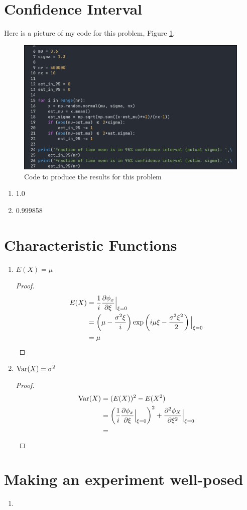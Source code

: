 \documentclass{article}
\begin{document}
\section{Confidence Interval}
    Here is a picture of my code for this problem, Figure \ref{fig:prob6_code}.
    \begin{figure}[t]
        \centering
        \includegraphics[width=\textwidth]{prob6_code.png}
        \caption{Code to produce the results for this problem}
        \label{fig:prob6_code}
    \end{figure}
    \begin{enumerate}[label=\roman*)]
        \item 1.0
        \item 0.999858
    \end{enumerate}

\section{Characteristic Functions}
    \begin{enumerate}[label=\roman*)]
        \item $E(X) = \mu$
            \begin{proof}
                \begin{align*}
                    E(X) &= \frac{1}{i}\frac{\partial \phi_x}{\partial \xi}\Big|_{\xi = 0}\\
                    &= \left(\mu - \frac{\sigma^2\xi}{i}\right)\exp\left(i\mu\xi -
                    \frac{\sigma^2\xi^2}{2}\right)\Big|_{\xi = 0}\\
                    &= \mu
                \end{align*}
            \end{proof}
        \item $\text{Var}(X) = \sigma^2$
            \begin{proof}
                \begin{align*}
                    \text{Var}(X) &= (E(X))^2 - E(X^2)\\
                    &= \left(\frac{1}{i}\frac{\partial \phi_x}{\partial \xi}\Big|_{\xi = 0}\right)^2
                    + \frac{\partial^2 \phi_X}{\partial \xi^2}\Big|_{\xi = 0}\\
                    &= 
                \end{align*}
            \end{proof}
    \end{enumerate}
\section{Making an experiment well-posed}
    \begin{enumerate}[label=\roman*)]
        \item
    \end{enumerate}
\end{document}
